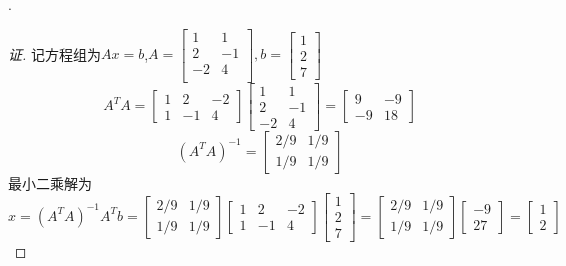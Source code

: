 \documentclass[10pt,a4paper]{report}
\begin{document}
.
\begin{proof}[证]
	记方程组为$Ax=b$,$A = \left[
	\begin{matrix}
	1 & 1\\
	2 & -1\\
	-2 & 4\\
	\end{matrix}
	\right], b = \left[
	\begin{matrix}
	1\\
	2\\
	7
	\end{matrix}
	\right]$
	$$
	A^{T}A=\left[
	\begin{matrix}
	1 & 2 & -2\\
	1 & -1 & 4
	\end{matrix}
	\right]\left[
	\begin{matrix}
	1 & 1\\
	2 & -1\\
	-2 & 4
	\end{matrix}
	\right] = \left[
	\begin{matrix}
	9 & -9\\
	-9 & 18
	\end{matrix}
	\right]
	$$
	$$
	(A^{T}A)^{-1} = \left[
	\begin{matrix}
	2/9 & 1/9\\
	1/9 & 1/9
	\end{matrix}
	\right]
	$$
	最小二乘解为
	$$x = (A^{T}A)^{-1}A^{T}b = \left[
	\begin{matrix}
	2/9 & 1/9\\
	1/9 & 1/9
	\end{matrix}
	\right]\left[
	\begin{matrix}
	1 & 2 & -2\\
	1 & -1 & 4
	\end{matrix}
	\right]\left[
	\begin{matrix}
	1\\
	2\\
	7
	\end{matrix}
	\right] = \left[
	\begin{matrix}
	2/9 & 1/9\\
	1/9 & 1/9
	\end{matrix}
	\right]\left[
	\begin{matrix}
	-9\\
	27
	\end{matrix}
	\right] = \left[
	\begin{matrix}
	1\\
	2
	\end{matrix}
	\right]$$
\end{proof}
\end{document}
